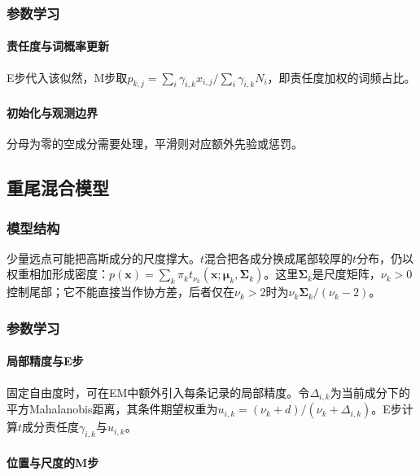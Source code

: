 \subsubsection{参数学习}

\paragraph{责任度与词概率更新}

E步代入该似然，M步取$p_{k,j}=\sum_i\gamma_{i,k}x_{i,j}/\sum_i\gamma_{i,k}N_i$，即责任度加权的词频占比。

\paragraph{初始化与观测边界}

分母为零的空成分需要处理，平滑则对应额外先验或惩罚。

\subsection{重尾混合模型}

\subsubsection{模型结构}

少量远点可能把高斯成分的尺度撑大。$t$混合把各成分换成尾部较厚的$t$分布，仍以权重相加形成密度：$p(\bm x)=\sum_k\pi_k t_{\nu_k}(\bm x;\bm\mu_k,\bm\Sigma_k)$。这里$\bm\Sigma_k$是尺度矩阵，$\nu_k>0$控制尾部；它不能直接当作协方差，后者仅在$\nu_k>2$时为$\nu_k\bm\Sigma_k/(\nu_k-2)$。

\subsubsection{参数学习}

\paragraph{局部精度与E步}

固定自由度时，可在EM中额外引入每条记录的局部精度。令$\Delta_{i,k}$为当前成分下的平方Mahalanobis距离，其条件期望权重为$u_{i,k}=(\nu_k+d)/(\nu_k+\Delta_{i,k})$。E步计算$t$成分责任度$\gamma_{i,k}$与$u_{i,k}$。

\paragraph{位置与尺度的M步}

